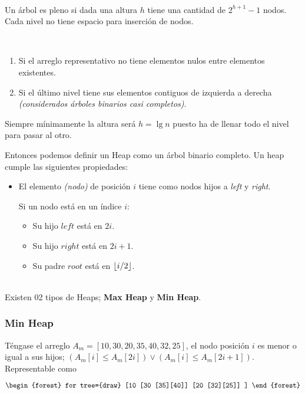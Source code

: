 \begin{definition}~\\
	Un árbol es pleno si dada una altura $h$ tiene una cantidad de $2^{h+1}-1$ nodos. Cada nivel no tiene espacio para inserción de nodos.
\end{definition}

\begin{definition}~
	\begin{enumerate}
		\item Si el arreglo representativo no tiene elementos nulos entre elementos existentes.
		\item Si el último nivel tiene sus elementos contiguos de izquierda a derecha \textit{(considerados árboles binarios casi completos)}.
	\end{enumerate}
	Siempre mínimamente la altura será $h=\lg n$ puesto ha de llenar todo el nivel para pasar al otro.
\end{definition}

Entonces podemos definir un Heap como un árbol binario completo.
Un heap cumple las siguientes propiedades:
\begin{itemize}
	\item El elemento \textit{(nodo)} de posición $i$ tiene como nodos hijos a \textit{left} y \textit{right}.

	      Si un nodo está en un índice $i$:
	      \begin{itemize}
		      \item Su hijo $left$ está en $2i$.
		      \item Su hijo $right$ está en $2i+1$.
		      \item Su padre $root$ está en $\left\lfloor i/2 \right\rfloor$.
	      \end{itemize}
\end{itemize}~\\
Existen 02 tipos de Heaps; \textbf{Max Heap} y \textbf{Min Heap}.

\subsubsection{Min Heap}
Téngase el arreglo $A_m=[10,30,20,35,40,32,25]$, el nodo posición $i$ es menor o igual a sus hijos; $(A_m[i] \le A_m[2i]) \lor (A_m[i] \le A_m[2i+1])$. Representable como

$$\begin{forest}
		for tree={draw}
		[10
			[30
					[35][40]]
			[20
					[32][25]]
		]
	\end{forest}$$

